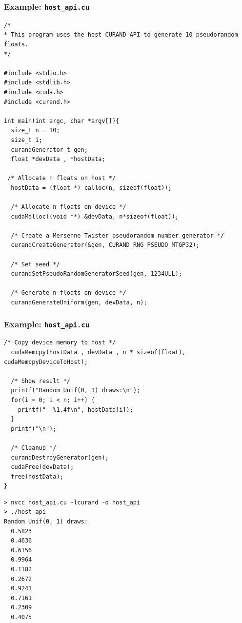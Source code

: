 \documentclass[handout]{beamer}
\numberwithin{equation}{section}
\begin{document}
\begin{frame}[fragile]
\frametitle{Example: {\tt host\_api.cu}} \lstset{basicstyle=\tiny}
\begin{lstlisting}[name=host]
/*
* This program uses the host CURAND API to generate 10 pseudorandom floats.
*/

#include <stdio.h> 
#include <stdlib.h>
#include <cuda.h> 
#include <curand.h>

int main(int argc, char *argv[]){
  size_t n = 10;
  size_t i; 
  curandGenerator_t gen; 
  float *devData , *hostData;

 /* Allocate n floats on host */
  hostData = (float *) calloc(n, sizeof(float));
  
  /* Allocate n floats on device */ 
  cudaMalloc((void **) &devData, n*sizeof(float));

  /* Create a Mersenne Twister pseudorandom number generator */ 
  curandCreateGenerator(&gen, CURAND_RNG_PSEUDO_MTGP32);

  /* Set seed */ 
  curandSetPseudoRandomGeneratorSeed(gen, 1234ULL);
  
  /* Generate n floats on device */
  curandGenerateUniform(gen, devData, n);

\end{lstlisting}
\end{frame}

\begin{frame}[fragile]
\frametitle{Example: {\tt host\_api.cu}} \lstset{basicstyle=\tiny}
\begin{lstlisting}[name=host]
 /* Copy device memory to host */ 
  cudaMemcpy(hostData , devData , n * sizeof(float), cudaMemcpyDeviceToHost);

  /* Show result */
  printf("Random Unif(0, 1) draws:\n");
  for(i = 0; i < n; i++) {
    printf("  %1.4f\n", hostData[i]); 
  }
  printf("\n");

  /* Cleanup */ 
  curandDestroyGenerator(gen); 
  cudaFree(devData);
  free(hostData);
}
\end{lstlisting}

\pause \begin{lstlisting}
> nvcc host_api.cu -lcurand -o host_api
> ./host_api
Random Unif(0, 1) draws:
  0.5823
  0.4636
  0.6156
  0.9964
  0.1182
  0.2672
  0.9241
  0.7161
  0.2309
  0.4075
\end{lstlisting}
\end{frame}
\end{document}
